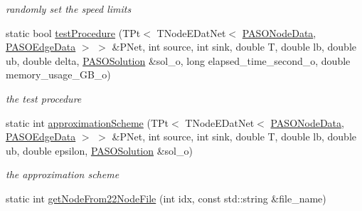\begin{DoxyCompactItemize}
\begin{DoxyCompactList}\small\item\em randomly set the speed limits \end{DoxyCompactList}\item 
static bool \hyperlink{class_p_a_s_o_util_adb72756ff43f7e9f46560fdbff089597}{test\+Procedure} (T\+Pt$<$ T\+Node\+E\+Dat\+Net$<$ \hyperlink{class_p_a_s_o_node_data}{P\+A\+S\+O\+Node\+Data}, \hyperlink{class_p_a_s_o_edge_data}{P\+A\+S\+O\+Edge\+Data} $>$ $>$ \&P\+Net, int source, int sink, double T, double lb, double ub, double delta, \hyperlink{class_p_a_s_o_solution}{P\+A\+S\+O\+Solution} \&sol\+\_\+o, long elapsed\+\_\+time\+\_\+second\+\_\+o, double memory\+\_\+usage\+\_\+\+G\+B\+\_\+o)
\begin{DoxyCompactList}\small\item\em the test procedure \end{DoxyCompactList}\item 
\hypertarget{class_p_a_s_o_util_a584075fefe05c92fa179aca7e91534e5}{}static int \hyperlink{class_p_a_s_o_util_a584075fefe05c92fa179aca7e91534e5}{approximation\+Scheme} (T\+Pt$<$ T\+Node\+E\+Dat\+Net$<$ \hyperlink{class_p_a_s_o_node_data}{P\+A\+S\+O\+Node\+Data}, \hyperlink{class_p_a_s_o_edge_data}{P\+A\+S\+O\+Edge\+Data} $>$ $>$ \&P\+Net, int source, int sink, double T, double lb, double ub, double epsilon, \hyperlink{class_p_a_s_o_solution}{P\+A\+S\+O\+Solution} \&sol\+\_\+o)\label{class_p_a_s_o_util_a584075fefe05c92fa179aca7e91534e5}

\begin{DoxyCompactList}\small\item\em the approximation scheme \end{DoxyCompactList}\item 
\hypertarget{class_p_a_s_o_util_a18673a185c3d6d5702cf4245f6b17fed}{}static int \hyperlink{class_p_a_s_o_util_a18673a185c3d6d5702cf4245f6b17fed}{get\+Node\+From22\+Node\+File} (int idx, const std\+::string \&file\+\_\+name)\label{class_p_a_s_o_util_a18673a185c3d6d5702cf4245f6b17fed}


\end{DoxyCompactItemize}
